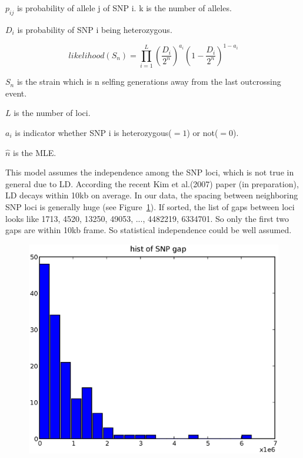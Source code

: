 \documentclass[a4paper,10pt]{article}
\begin{document}
$p_{ij}$ is probability of allele j of SNP i. k is the number of alleles.

$D_i$ is probability of SNP i being heterozygous.


\begin{equation}
likelihood(S_n) = \prod_{i=1}^L {(\frac{D_i}{2^n})}^{a_i} {(1-\frac{D_i}{2^n})}^{1-a_i}
\end{equation}

$S_n$ is the strain which is n selfing generations away from the last outcrossing event.

$L$ is the number of loci.

$a_i$ is indicator whether SNP i is heterozygous($=1$) or not($=0$).

$\hat{n}$ is the MLE.

This model assumes the independence among the SNP loci, which is not true in general due to LD. According the recent Kim et al.(2007) paper (in preparation), LD decays within 10kb on average. In our data, the spacing between neighboring SNP loci is generally huge (see Figure~\ref{f7}). If sorted, the list of gaps between loci looks like 1713, 4520, 13250, 49053, ..., 4482219, 6334701. So only the first two gaps are within 10kb frame. So statistical independence could be well assumed.

\begin{figure}
\includegraphics[width=1\textwidth]{figures/snp_locus_gap_hist.eps}
\caption{}\label{f7}
\end{figure}
\end{document}
